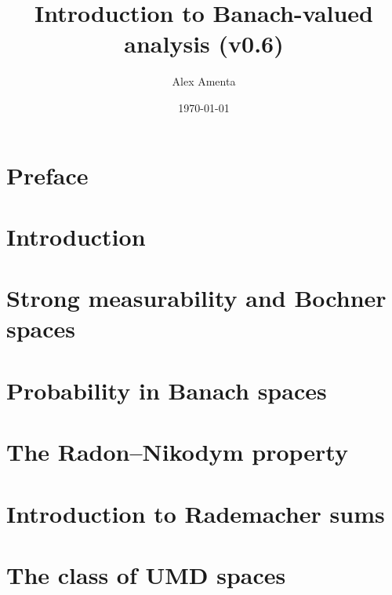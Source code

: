 \documentclass[a4paper,10pt]{amsbook}
\begin{document}
\title[Banach-valued analysis]{Introduction to Banach-valued analysis (v0.6)}
\date{\today}

\author[A. Amenta]{Alex Amenta}
\address{\noindent Mathematisches Institut \newline \indent Universit\"at Bonn, Bonn, Germany}

\maketitle
\tableofcontents


\chapter*{Preface}


\chapter{Introduction}
\label{sec:intro}


\chapter{Strong measurability and Bochner spaces}
\label{sec:Bochner-spaces}


\chapter{Probability in Banach spaces}
\label{sec:martingales} 


\chapter{The Radon--Nikodym property}
\label{sec:RNP}


\chapter{Introduction to Rademacher sums}
\label{sec:rademacher}


\chapter{The class of UMD spaces}
\label{sec:UMD}

\end{document}
